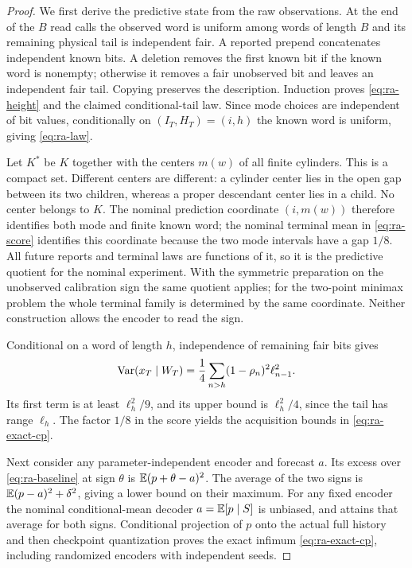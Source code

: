 \begin{proof}
We first derive the predictive state from the raw observations. At the end of the $B$ read calls the observed word is uniform among words of length $B$ and its remaining physical tail is independent fair. A reported prepend concatenates independent known bits. A deletion removes the first known bit if the known word is nonempty; otherwise it removes a fair unobserved bit and leaves an independent fair tail. Copying preserves the description. Induction proves \eqref{eq:ra-height} and the claimed conditional-tail law. Since mode choices are independent of bit values, conditionally on $(I_T,H_T)=(i,h)$ the known word is uniform, giving \eqref{eq:ra-law}.

Let $K^*$ be $K$ together with the centers $m(w)$ of all finite cylinders. This is a compact set. Different centers are different: a cylinder center lies in the open gap between its two children, whereas a proper descendant center lies in a child. No center belongs to $K$. The nominal prediction coordinate $(i,m(w))$ therefore identifies both mode and finite known word; the nominal terminal mean in \eqref{eq:ra-score} identifies this coordinate because the two mode intervals have a gap $1/8$. All future reports and terminal laws are functions of it, so it is the predictive quotient for the nominal experiment. With the symmetric preparation on the unobserved calibration sign the same quotient applies; for the two-point minimax problem the whole terminal family is determined by the same coordinate. Neither construction allows the encoder to read the sign.

Conditional on a word of length $h$, independence of remaining fair bits gives
\[
 \operatorname{Var}(x_T\mid W_T)=\frac14\sum_{n>h}(1-\rho_n)^2\ell_{n-1}^2.
\]
Its first term is at least $\ell_h^2/9$, and its upper bound is $\ell_h^2/4$, since the tail has range $\ell_h$. The factor $1/8$ in the score yields the acquisition bounds in \eqref{eq:ra-exact-cp}.

Next consider any parameter-independent encoder and forecast $a$. Its excess over \eqref{eq:ra-baseline} at sign $\theta$ is $\mathbb E(p+\theta-a)^2$. The average of the two signs is $\mathbb E(p-a)^2+\delta^2$, giving a lower bound on their maximum. For any fixed encoder the nominal conditional-mean decoder $a=\mathbb E[p\mid S]$ is unbiased, and attains that average for both signs. Conditional projection of $p$ onto the actual full history and then checkpoint quantization proves the exact infimum \eqref{eq:ra-exact-cp}, including randomized encoders with independent seeds.


\end{proof}
